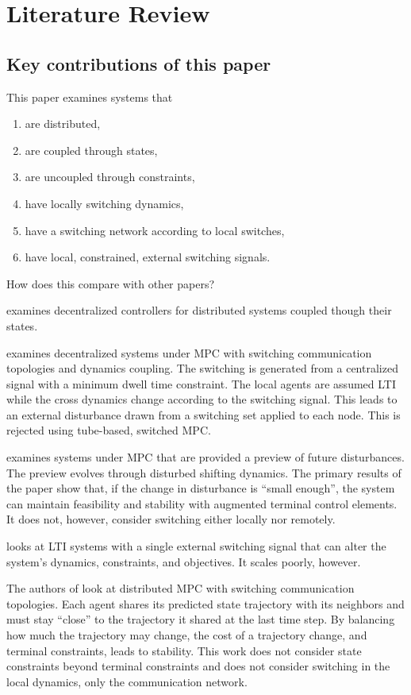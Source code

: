  \section{Literature Review}
 \subsection{Key contributions of this paper}
 This paper examines systems that
 \begin{enumerate}
 	\item are distributed,
 	\item are coupled through states,
 	\item are uncoupled through constraints,
 	\item have locally switching dynamics,
 	\item have a switching network according to local switches,
 	\item have local, constrained, external switching signals.
 \end{enumerate}
 How does this compare with other papers?

\cite{Riverso2015} examines decentralized controllers for distributed systems coupled though their states. 

\cite{Ahandani2020} examines decentralized systems under MPC with switching communication topologies and dynamics coupling. The switching is generated from a centralized signal with a minimum dwell time constraint. The local agents are assumed LTI while the cross dynamics change according to the switching signal. This leads to an external disturbance drawn from a switching set applied to each node. This is rejected using tube-based, switched MPC. 

\cite{Monasterios2019} examines systems under MPC that are provided a preview of future disturbances. The preview evolves through disturbed shifting dynamics. The primary results of the paper show that, if the change in disturbance is ``small enough'', the system can maintain feasibility and stability with augmented terminal control elements. It does not, however, consider switching either locally nor remotely. 

\cite{Danielson2019} looks at LTI systems with a single external switching signal that can alter the system's dynamics, constraints, and objectives. It scales poorly, however.

The authors of \cite{Li2020} look at distributed MPC with switching communication topologies. Each agent shares its predicted state trajectory with its neighbors and must stay ``close'' to the trajectory it shared at the last time step. By balancing how much the trajectory may change, the cost of a trajectory change, and terminal constraints, leads to stability. This work does not consider state constraints beyond terminal constraints and does not consider switching in the local dynamics, only the communication network. 